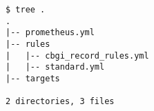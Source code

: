 \begin{verbatim}
$ tree .
.
|-- prometheus.yml
|-- rules
|   |-- cbgi_record_rules.yml
|   |-- standard.yml
|-- targets

2 directories, 3 files
\end{verbatim}